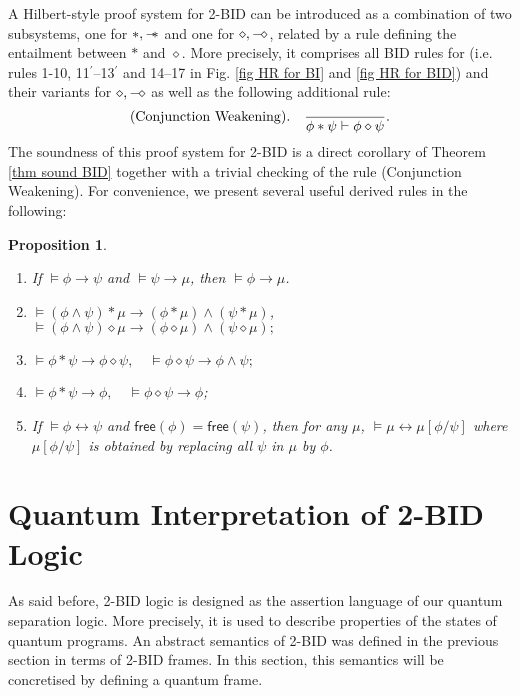\documentclass[conference,compsoc, 10pt]{IEEEtran}
\newtheorem{proposition}{Proposition}[section]
\newcommand {\LTypeF }[1] {{\mathsf{free}{\left(#1\right)}}}
\newcommand {\sepimp} {\mathrel{-\mkern-6mu*}}
\newcommand{\sd}{\diamond}%
\newcommand {\sdimp} {\mathrel{-\mkern-2.5mu\diamond}}
\begin{document}
\begin{appendices}
		A Hilbert-style proof system for 2-BID can be introduced as a combination of two subsystems, one for $\ast,\sepimp$ and one for $\sd,\sdimp$, related by a rule defining the entailment between $\ast$ and $\sd$. More precisely, it comprises all BID rules for (i.e. rules 1-10, 11$^\prime$--13$^\prime$ and 14--17 in Fig. \ref{fig HR for BI}  and \ref{fig HR for BID}) and their variants for $\sd,\sdimp$ as well as the following additional rule: 
		$$
		({\rm Conjunction\ Weakening}).\quad \frac{}{\phi\ast\psi\vdash\phi\sd\psi}.
		$$ 
		The soundness of this proof system for 2-BID is a direct corollary of Theorem \ref{thm sound BID} together with a trivial checking of the rule (Conjunction Weakening). For convenience, we present several useful derived rules in the following:
		\begin{proposition}
			\label{prop useful HR}
			\begin{enumerate}
				\item If $\models\phi\rightarrow\psi$ and $\models\psi\rightarrow\mu$, then $\models\phi\rightarrow\mu$.
				\item $\models (\phi\wedge\psi)\ast\mu\rightarrow(\phi\ast\mu)\wedge(\psi\ast\mu)$, \quad
				$\models (\phi\wedge\psi)\sd\mu\rightarrow(\phi\sd\mu)\wedge(\psi\sd\mu);$
				\item $\models \phi\ast\psi\rightarrow\phi\sd\psi, \quad \models \phi\sd\psi\rightarrow\phi\wedge\psi;$
				\item $\models \phi\ast\psi\rightarrow\phi, \quad \models \phi\sd\psi\rightarrow\phi$;
				\item If $\models\phi\leftrightarrow\psi$ and $\LTypeF{\phi} = \LTypeF{\psi}$, then for any $\mu$, $\models\mu\leftrightarrow\mu[\phi/\psi]$ where $\mu[\phi/\psi]$ is obtained by replacing all $\psi$ in $\mu$ by $\phi$.
			\end{enumerate}
		\end{proposition}
		
		\section{Quantum Interpretation of 2-BID Logic}
		\label{sec-q-interpret 2BID}
		
		As said before, 2-BID logic is designed as the assertion language of our quantum separation logic. More precisely, it is used to describe properties of the states of quantum programs. An abstract semantics of 2-BID was defined in the previous section in terms of 2-BID frames. In this section, this semantics will be concretised by defining a quantum frame.   
		

\end{appendices}
\end{document}
